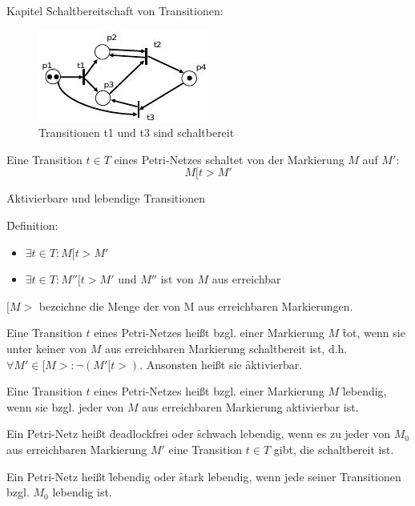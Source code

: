 \begin{chapter}{Kapitel}
\f{Schaltbereitschaft von Transitionen}:
\begin{figure}[!ht]
 \centering
 \includegraphics{pics/schaltbereitPetrinetz}
 \caption{Transitionen t1 und t3 sind schaltbereit}
\end{figure}

\noindent Eine Transition $t\in T$ eines Petri-Netzes schaltet von der Markierung $M$ auf $M'$: \[M[t>M'\]
\vspace*{5pt}

\f{Aktivierbare und lebendige Transitionen}
\vspace*{3pt}

\f{Definition}: 
\begin{itemize}
 \item $\exists t\in T:M[t>M'$
 \item $\exists t\in T:M''[t>M'$ und $M''$ ist von $M$ aus erreichbar
\end{itemize}
$[M>$ bezeichne die Menge der von M aus erreichbaren Markierungen.
\vspace*{6pt}

\noindent Eine Transition $t$ eines Petri-Netzes heißt bzgl. einer Markierung $M$ \f{tot}, wenn sie unter keiner von $M$ aus erreichbaren Markierung schaltbereit ist, 
d.h. $\forall M'\in [M>:\neg(M'[t>)$. Ansonsten heißt sie \f{aktivierbar}.
\vspace*{6pt}

\noindent Eine Transition $t$ eines Petri-Netzes heißt bzgl. einer Markierung $M$ \f{lebendig}, wenn sie bzgl. jeder von $M$ aus erreichbaren Markierung aktivierbar ist.
\vspace*{6pt}

\noindent Ein Petri-Netz heißt \f{deadlockfrei} oder \f{schwach lebendig}, wenn es zu jeder von $M_0$ aus erreichbaren Markierung $M'$ eine Transition $t\in T$ 
gibt, die schaltbereit ist.
\vspace*{6pt}

\noindent Ein Petri-Netz heißt \f{lebendig} oder \f{stark lebendig}, wenn jede seiner Transitionen bzgl. $M_0$ lebendig ist. 
\vspace*{6pt}


\end{chapter}
